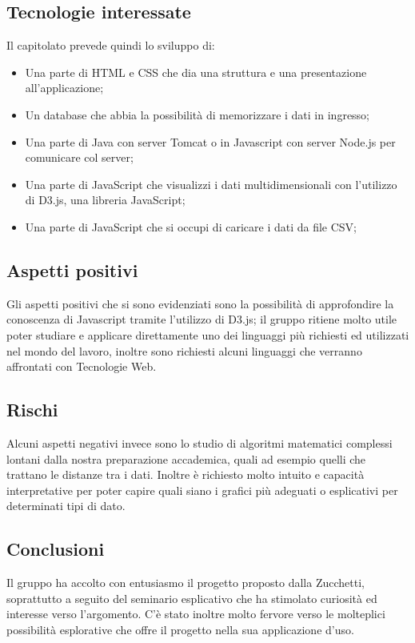 \documentclass[../studio-di-fattibilita.tex]{subfiles}
\begin{document}
\subsection{Tecnologie interessate}%
\label{sub:c4_tecnologie_interessate}
Il capitolato prevede quindi lo sviluppo di:
\begin{itemize}
  \item Una parte di HTML e CSS che dia una struttura e una presentazione all’applicazione;
  \item Un database che abbia la possibilità di memorizzare i dati in ingresso;
  \item Una parte di Java con server Tomcat o in Javascript con server Node.js per comunicare col server;
  \item Una parte di JavaScript che visualizzi i dati multidimensionali con l'utilizzo di D3.js, una libreria JavaScript;
  \item Una parte di JavaScript che si occupi di caricare i dati da file CSV;
\end{itemize}

\subsection{Aspetti positivi}%
\label{sub:c4_aspetti_positivi}
Gli aspetti positivi che si sono evidenziati sono la possibilità di approfondire la conoscenza di Javascript tramite l’utilizzo di D3.js; il gruppo ritiene molto utile poter studiare e applicare direttamente uno dei linguaggi più richiesti ed utilizzati nel mondo del lavoro, inoltre sono richiesti alcuni linguaggi che verranno affrontati con Tecnologie Web.


\subsection{Rischi}%
\label{sub:c4_rischi}
Alcuni aspetti negativi invece sono lo studio di algoritmi matematici complessi lontani dalla nostra preparazione accademica, quali ad esempio quelli che trattano le distanze tra i dati. Inoltre è richiesto molto intuito e capacità interpretative per poter capire quali siano i grafici più adeguati o esplicativi per determinati tipi di dato.

\subsection{Conclusioni}%
\label{sub:c4_conclusioni}
Il gruppo ha accolto con entusiasmo il progetto proposto dalla Zucchetti, soprattutto a seguito del seminario esplicativo che ha stimolato curiosità ed interesse verso l’argomento. C’è stato inoltre molto fervore verso le molteplici possibilità esplorative che offre il progetto nella sua applicazione d’uso.
\end{document}
